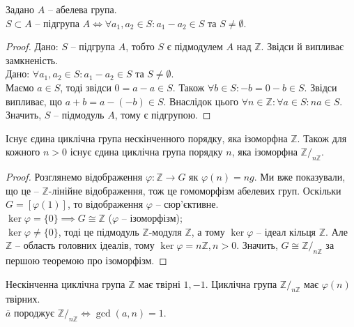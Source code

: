 \documentclass{math_library}
\begin{document}
\begin{theorem*}
Задано $A$ -- абелева група.\\
$S \subset A$ -- підгрупа $A \iff \forall a_1,a_2 \in S: a_1 - a_2 \in S$ та $S \neq \emptyset$.
\end{theorem*}

\begin{proof}
\rightproof Дано: $S$ -- підгрупа $A$, тобто $S$ є підмодулем $A$ над $\mathbb{Z}$. Звідси й випливає замкненість.
\bigskip \\
\leftproof Дано: $\forall a_1,a_2 \in S: a_1 - a_2 \in S$ та $S \neq \emptyset$.\\
Маємо $a \in S$, тоді звідси $0 = a - a \in S$. Також $\forall b \in S: -b = 0-b \in S$. Звідси випливає, що $a+b = a-(-b) \in S$. Внаслідок цього $\forall n \in \mathbb{Z}: \forall a \in S: na \in S$. Значить, $S$ -- підмодуль $A$, тому є підгрупою.
\end{proof}

\begin{theorem*}
Існує єдина циклічна група нескінченного порядку, яка ізоморфна $\mathbb{Z}$. Також для кожного $n > 0$ існує єдина циклічна група порядку $n$, яка ізоморфна $\mathbb{Z}/_{n \mathbb{Z}}$.
\end{theorem*}

\begin{proof}
Розглянемо відображення $\varphi \colon \mathbb{Z} \to G$ як $\varphi(n) = ng$. Ми вже показували, що це -- $\mathbb{Z}$-лінійне відображення, тож це гомоморфізм абелевих груп. Оскільки $G = [\varphi(1)]$, то відображення $\varphi$ -- сюр'єктивне.\\
$\ker \varphi = \{0\} \implies G \cong \mathbb{Z}$ ($\varphi$ -- ізоморфізм);\\
$\ker \varphi \neq \{0\}$, тоді це підмодуль $\mathbb{Z}$-модуля $\mathbb{Z}$, а тому $\ker \varphi$ -- ідеал кільця $\mathbb{Z}$. Але $\mathbb{Z}$ -- область головних ідеалів, тому $\ker \varphi = n \mathbb{Z}, n > 0$. Значить, $G \cong \mathbb{Z}/_{n \mathbb{Z}}$ за першою теоремою про ізоморфізм.
\end{proof}

\begin{proposition*}
Нескінченна циклічна група $\mathbb{Z}$ має твірні $1,-1$. Циклічна група $\mathbb{Z}/_{n \mathbb{Z}}$ має $\varphi(n)$ твірних.\\
$\overline{a}$ породжує $\mathbb{Z}/_{n \mathbb{Z}} \iff \gcd(a,n) = 1$.
\end{proposition*}
\end{document}
